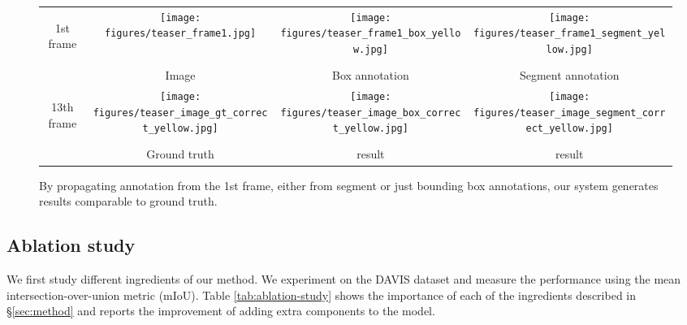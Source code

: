 \documentclass[10pt,twocolumn,letterpaper]{article}
\begin{document}
\begin{figure}
\begin{centering}
\begin{centering}
\begin{tabular}{@{}c@{ }c@{ }c@{ }c@{ }}
\begin{turn}{90}
{\footnotesize{} \hspace{0.5em} 1st frame}
\end{turn}
&\texttt{[image: figures/teaser\_frame1.jpg]} &
\texttt{[image: figures/teaser\_frame1\_box\_yellow.jpg]} &
\texttt{[image: figures/teaser\_frame1\_segment\_yellow.jpg]} \tabularnewline
&\footnotesize{}Image & \footnotesize{}Box annotation & \footnotesize{}Segment annotation\tabularnewline
\begin{turn}{90}
{\footnotesize{} \hspace{0.5em} 13th frame}
\end{turn}
&\texttt{[image: figures/teaser\_image\_gt\_correct\_yellow.jpg]} &
\texttt{[image: figures/teaser\_image\_box\_correct\_yellow.jpg]} &
\texttt{[image: figures/teaser\_image\_segment\_correct\_yellow.jpg]}\tabularnewline
&\footnotesize{}Ground truth & \footnotesize{}  result  & \footnotesize{}  result\tabularnewline
\end{tabular}
\par\end{centering}

\par\end{centering}
\caption{\label{fig:teaser}By propagating annotation from the 1st frame, either from segment or just bounding box annotations, our system generates results comparable to ground truth.}
\end{figure}

\subsection{Ablation study}
\label{sec:ablation-study}




We first study different ingredients of our method. We experiment on the DAVIS dataset and measure the performance using the mean intersection-over-union metric (mIoU).
Table \ref{tab:ablation-study} shows the importance of each of the ingredients described in \S\ref{sec:method} and reports the improvement of adding extra components to the  model.
\end{document}
